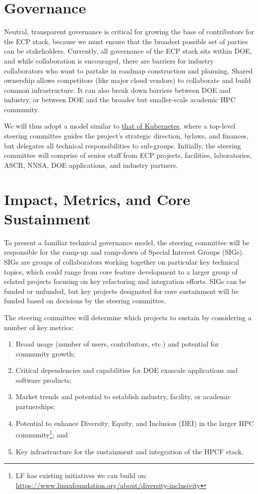 \documentclass[11pt]{article}
\begin{document}
\section{Governance}

Neutral, transparent governance is critical for growing the base of contributors for the
ECP stack, because we must ensure that the broadest possible set of parties can be
stakeholders. Currently, all governance of the ECP stack sits within DOE, and while
collaboration is encouraged, there are barriers for industry collaborators who want to
partake in roadmap construction and planning. Shared ownership allows competitors (like
major cloud vendors) to collaborate and build common infrastructure. It can also break
down barriers between DOE and industry, or between DOE and the broader but smaller-scale
academic HPC community.

We will thus adopt a model similar to
\href{https://github.com/kubernetes/steering/blob/main/charter.md}{that of Kubernetes},
where a top-level steering committee guides the project's strategic direction, bylaws,
and finances, but delegates all technical responsibilities to sub-groups. Initially, the
steering committee will comprise of senior staff from ECP projects, facilities, laboratories,
ASCR, NNSA, DOE applications, and industry partners.

\section{Impact, Metrics, and Core Sustainment}

To present a familiar technical governance model, the steering committee will be
responsible for the ramp-up and ramp-down of Special Interest Groups (SIGs). SIGs are
groups of collaborators working together on particular key technical topics, which could
range from core feature development to a larger group of related projects focusing on
key refactoring and integration efforts. SIGs can be funded or unfunded, but key
projects designated for core sustainment will be funded based on decisions by the
steering committee.

The steering committee will determine which projects to sustain by considering a number
of key metrics:

\begin{enumerate}
\item Broad usage (number of users, contributors, etc.) and potential for community
  growth;
\item Critical dependencies and capabilities for DOE exascale applications and software
  products;
\item Market trends and potential to establish industry, facility, or academic
  partnerships;
\item Potential to enhance Diversity, Equity, and Inclusion (DEI) in the larger HPC
  community\footnote{LF has existing initiatives we can build on:
  \href{https://www.linuxfoundation.org/about/diversity-inclusivity}{https://www.linuxfoundation.org/about/diversity-inclusivity}};
  and
\item Key infrastructure for the sustainment and integration of the HPCF stack.
\end{enumerate}
\end{document}
